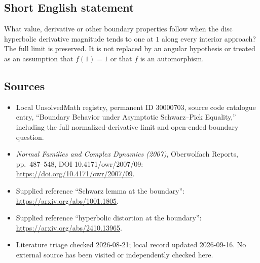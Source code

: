 \documentclass[11pt]{article}
\begin{document}
\subsection{Short English statement}
What value, derivative or other boundary properties follow when the disc hyperbolic derivative magnitude tends to one at \(1\) along every interior approach? The full limit is preserved. It is not replaced by an angular hypothesis or treated as an assumption that \(f(1)=1\) or that \(f\) is an automorphism.
\subsection{Sources}
\begin{itemize}
\item Local UnsolvedMath registry, permanent ID 30000703, source code catalogue entry, ``Boundary Behavior under Asymptotic Schwarz--Pick Equality,'' including the full normalized-derivative limit and open-ended boundary question.
\item \emph{Normal Families and Complex Dynamics (2007)}, Oberwolfach Reports, pp.\ 487--548, DOI 10.4171/owr/2007/09: \url{https://doi.org/10.4171/owr/2007/09}.
\item Supplied reference ``Schwarz lemma at the boundary'': \url{https://arxiv.org/abs/1001.1805}.
\item Supplied reference ``hyperbolic distortion at the boundary'': \url{https://arxiv.org/abs/2410.13965}.
\item Literature triage checked 2026-08-21; local record updated 2026-09-16. No external source has been visited or independently checked here.
\end{itemize}
\end{document}
